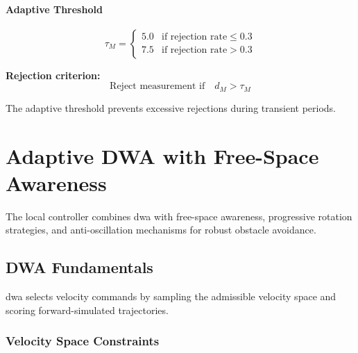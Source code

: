 \paragraph{Adaptive Threshold}
\begin{equation}
\tau_M = \begin{cases}
5.0 & \text{if rejection rate} \leq 0.3 \\
7.5 & \text{if rejection rate} > 0.3
\end{cases}
\label{eq:adaptive_threshold}
\end{equation}

\textbf{Rejection criterion:}
\begin{equation}
\text{Reject measurement if} \quad d_M > \tau_M
\label{eq:rejection_criterion}
\end{equation}

The adaptive threshold prevents excessive rejections during transient periods.




\section{Adaptive DWA with Free-Space Awareness}
\label{sec:meth_dwa}

The local controller combines \acrfull{dwa} with free-space awareness, progressive rotation strategies, and anti-oscillation mechanisms for robust obstacle avoidance.


\subsection{DWA Fundamentals}

\acrshort{dwa} selects velocity commands by sampling the admissible velocity space and scoring forward-simulated trajectories.

\subsubsection{Velocity Space Constraints}

